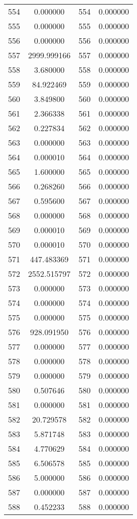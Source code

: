 \documentclass[12pt]{article}
\begin{document}
\begin{longtable}{@{}cccc@{}}
554 & 0.000000 & 554 & 0.000000 \\
555 & 0.000000 & 555 & 0.000000 \\
556 & 0.000000 & 556 & 0.000000 \\
557 & 2999.999166 & 557 & 0.000000 \\
558 & 3.680000 & 558 & 0.000000 \\
559 & 84.922469 & 559 & 0.000000 \\
560 & 3.849800 & 560 & 0.000000 \\
561 & 2.366338 & 561 & 0.000000 \\
562 & 0.227834 & 562 & 0.000000 \\
563 & 0.000000 & 563 & 0.000000 \\
564 & 0.000010 & 564 & 0.000000 \\
565 & 1.600000 & 565 & 0.000000 \\
566 & 0.268260 & 566 & 0.000000 \\
567 & 0.595600 & 567 & 0.000000 \\
568 & 0.000000 & 568 & 0.000000 \\
569 & 0.000010 & 569 & 0.000000 \\
570 & 0.000010 & 570 & 0.000000 \\
571 & 447.483369 & 571 & 0.000000 \\
572 & 2552.515797 & 572 & 0.000000 \\
573 & 0.000000 & 573 & 0.000000 \\
574 & 0.000000 & 574 & 0.000000 \\
575 & 0.000000 & 575 & 0.000000 \\
576 & 928.091950 & 576 & 0.000000 \\
577 & 0.000000 & 577 & 0.000000 \\
578 & 0.000000 & 578 & 0.000000 \\
579 & 0.000000 & 579 & 0.000000 \\
580 & 0.507646 & 580 & 0.000000 \\
581 & 0.000000 & 581 & 0.000000 \\
582 & 20.729578 & 582 & 0.000000 \\
583 & 5.871748 & 583 & 0.000000 \\
584 & 4.770629 & 584 & 0.000000 \\
585 & 6.506578 & 585 & 0.000000 \\
586 & 5.000000 & 586 & 0.000000 \\
587 & 0.000000 & 587 & 0.000000 \\
588 & 0.452233 & 588 & 0.000000 \\

\end{longtable}
\end{document}
